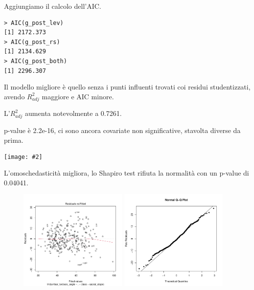 \documentclass{beamer}
\newcommand{\fg}[2]{%
  \begin{center}
      \texttt{[image: \#2]}%
  \end{center}
}
\begin{document}
\begin{frame}[fragile]
	Aggiungiamo il calcolo dell'AIC.
	\begin{verbatim}
> AIC(g_post_lev)
[1] 2172.373
> AIC(g_post_rs)
[1] 2134.629
> AIC(g_post_both)
[1] 2296.307
	\end{verbatim}

	Il modello migliore è quello senza i punti influenti trovati coi residui studentizzati, avendo $R^{2}_{adj}$ maggiore e AIC minore.

	L'$R^2_{adj}$ aumenta notevolmente a 0.7261.

	p-value è 2.2e-16, ci sono ancora covariate non significative, stavolta diverse da prima.
\end{frame}



\begin{frame}
	\fg{0.6}{04residuistudentizzati}
\end{frame}



\begin{frame}
	L'omoschedasticità migliora, lo Shapiro test rifiuta la normalità con un p-value di 0.04041.
	\begin{figure}
	   \includegraphics[width=0.475\textwidth]{07omoschedasticita}
	   \hfill
	   \includegraphics[width=0.475\textwidth]{08qqplot}
	\end{figure}
\end{frame}
\end{document}

